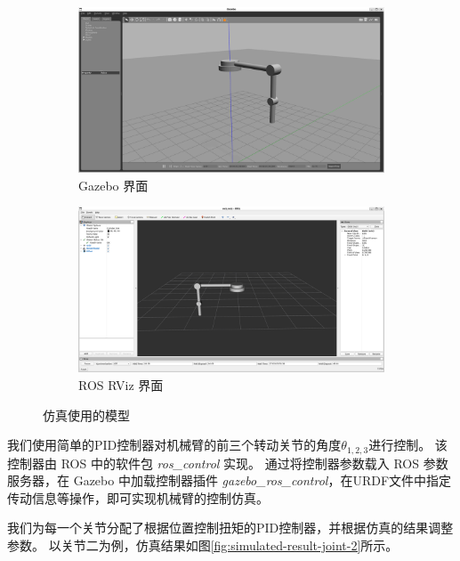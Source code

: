 \documentclass{ctexart}
\begin{document}
\begin{figure}[ht]
    \hfill
    \begin{subfigure}{0.45\linewidth}
        \centering
        \includegraphics[width=\linewidth]{figures/robotic-arm-gazebo}
        \caption{Gazebo 界面}
    \end{subfigure}
    \hfill
    \begin{subfigure}{0.45\linewidth}
        \centering
        \includegraphics[width=\linewidth]{figures/robotic-arm-rviz}
        \caption{ROS RViz 界面}
    \end{subfigure}
    \hfill
    \caption{仿真使用的模型}
    \label{fig:model}
\end{figure}

我们使用简单的PID控制器对机械臂的前三个转动关节的角度$\theta_{1,2,3}$进行控制。
该控制器由 ROS 中的软件包 \emph{ros\_control} 实现。
通过将控制器参数载入 ROS 参数服务器，在 Gazebo 中加载控制器插件 \emph{gazebo\_ros\_control}，在URDF文件中指定传动信息等操作，即可实现机械臂的控制仿真。

我们为每一个关节分配了根据位置控制扭矩的PID控制器，并根据仿真的结果调整参数。
以关节二为例，仿真结果如图\ref{fig:simulated-result-joint-2}所示。
\end{document}
